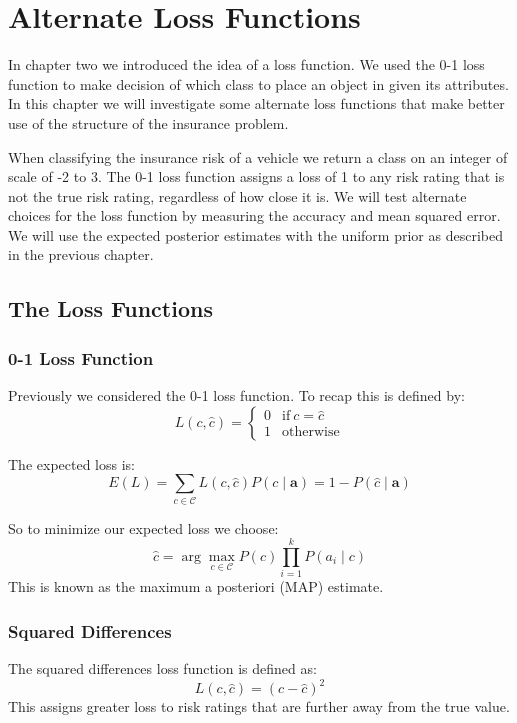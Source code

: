 \chapter{Alternate Loss Functions}

In chapter two we introduced the idea of a loss function.
We used the 0-1 loss function to make decision of which class to place an object in given its attributes.
In this chapter we will investigate some alternate loss functions that make better use of the structure of the insurance problem.

When classifying the insurance risk of a vehicle we return a class on an integer of scale of -2 to 3.
The 0-1 loss function assigns a loss of 1 to any risk rating that is not the true risk rating, regardless of how close it is.
We will test alternate choices for the loss function by measuring the accuracy and mean squared error.
We will use the expected posterior estimates with the uniform prior as described in the previous chapter.

\section{The Loss Functions}
\subsection{0-1 Loss Function}
Previously we considered the 0-1 loss function.
To recap this is defined by:
\begin{equation}
	L(c, \hat{c}) = 
	\begin{cases}
		0 & \text{if}\ c = \hat{c} \\
		1 & \text{otherwise}
	\end{cases}
\end{equation}

The expected loss is:
\begin{equation}
	E(L) = \sum_{c \in \mathcal{C}} L(c, \hat{c})P(c \mid \mathbf{a}) = 1 - P(\hat{c} \mid \mathbf{a})
\end{equation}

So to minimize our expected loss we choose:
\begin{equation}
	\hat c = \arg\max_{c \in \mathcal{C}} P(c)\prod_{i=1}^{k}P(a_i \mid c)
\end{equation}
This is known as the maximum a posteriori (MAP) estimate.

\subsection{Squared Differences}
The squared differences loss function is defined as:
\begin{equation}
	L(c, \hat{c}) = (c - \hat{c})^2
\end{equation}
This assigns greater loss to risk ratings that are further away from the true value.

